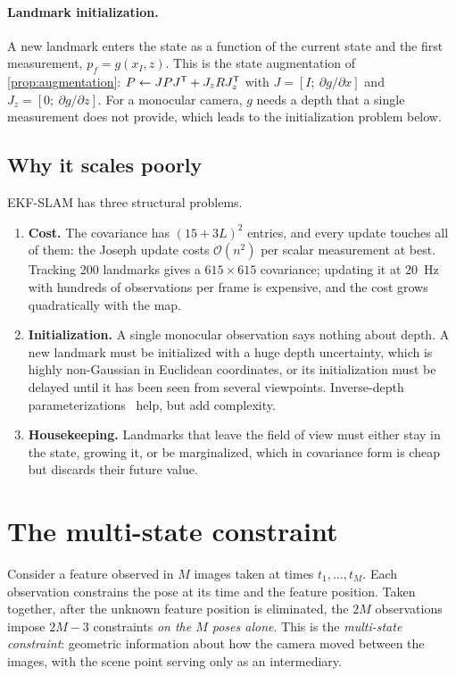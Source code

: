 \paragraph{Landmark initialization.} A new landmark enters the state as a function of the current state and the first measurement, $p_f = g(x_I, z)$. This is the
state augmentation of \cref{prop:augmentation}: $P \gets JPJ^{\mathsf{T}} + J_zRJ_z^{\mathsf{T}}$ with $J = [I;\ \partial g/\partial x]$ and $J_z = [0;\ \partial g/\partial z]$. For a monocular camera, $g$
needs a depth that a single measurement does not provide, which leads to the initialization problem below.

\subsection{Why it scales poorly}

EKF-SLAM has three structural problems.
\begin{enumerate}
  \item \textbf{Cost.} The covariance has $(15 + 3L)^2$ entries, and every update touches all of them: the Joseph update costs $\mathcal{O}(n^2)$ per scalar measurement at
        best. Tracking 200 landmarks gives a $615\times615$ covariance; updating it at 20~Hz with hundreds of observations per frame is expensive, and the cost
        grows quadratically with the map.
  \item \textbf{Initialization.} A single monocular observation says nothing about depth. A new landmark must be
        initialized with a huge depth uncertainty, which is highly non-Gaussian in Euclidean coordinates, or its
        initialization must be delayed until it has been seen from several viewpoints. Inverse-depth
        parameterizations~\cite{civera2008inverse} help, but add complexity.
  \item \textbf{Housekeeping.} Landmarks that leave the field of view must either stay in the state, growing it, or be
        marginalized, which in covariance form is cheap but discards their future value.
\end{enumerate}

\section{The multi-state constraint}

Consider a feature observed in $M$ images taken at times $t_1, \dots, t_M$. Each observation constrains the pose at its
time and the feature position. Taken together, after the unknown feature position is eliminated, the $2M$ observations
impose $2M - 3$ constraints \emph{on the $M$ poses alone}. This is the \emph{multi-state constraint}: geometric information
about how the camera moved between the images, with the scene point serving only as an intermediary.

